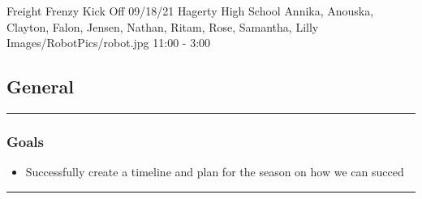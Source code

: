 \insertmeeting 
	{Freight Frenzy Kick Off} 
	{09/18/21}
	{Hagerty High School}
	{Annika, Anouska, Clayton, Falon, Jensen, Nathan, Ritam, Rose, Samantha, Lilly}
	{Images/RobotPics/robot.jpg}
	{11:00 - 3:00}
	
\subsection*{General}
\noindent\hfil\rule{\textwidth}{.4pt}\hfil
\subsubsection*{Goals}
\begin{itemize}
    \item Successfully create a timeline and plan for the season on how we can succed 

\end{itemize} 

\noindent\hfil\rule{\textwidth}{.4pt}\hfil

